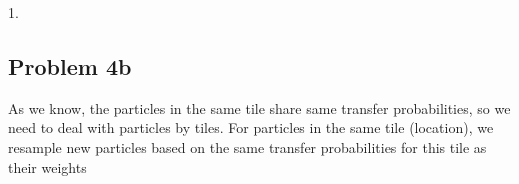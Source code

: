 \documentclass[paper=a4, fontsize=10pt]{scrartcl} %
\numberwithin{equation}{section} %
\numberwithin{figure}{section} %
\numberwithin{table}{section} %
\begin{document}
\begin{spacing}{1.}
\subsection{Problem 4b}
As we know, the particles in the same tile share same transfer probabilities, so we need to deal with particles by tiles. For particles in the same tile (location), we resample new particles based on the same transfer probabilities for this tile as their weights



















\end{spacing}
\end{document}
